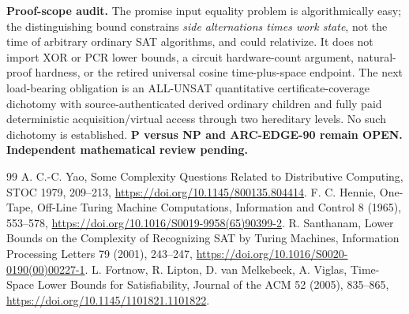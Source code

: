 \documentclass[11pt]{article}
\begin{document}
\textbf{Proof-scope audit.} The promise input equality problem is algorithmically easy; the distinguishing bound constrains \emph{side alternations times work state}, not the time of arbitrary ordinary SAT algorithms, and could relativize. It does not import XOR or PCR lower bounds, a circuit hardware-count argument, natural-proof hardness, or the retired universal cosine time-plus-space endpoint. The next load-bearing obligation is an ALL-UNSAT quantitative certificate-coverage dichotomy with source-authenticated derived ordinary children and fully paid deterministic acquisition/virtual access through two hereditary levels. No such dichotomy is established. \textbf{P versus NP and ARC-EDGE-90 remain OPEN. Independent mathematical review pending.}

\begin{thebibliography}{99}
 A. C.-C. Yao, Some Complexity Questions Related to Distributive Computing, STOC 1979, 209--213, \url{https://doi.org/10.1145/800135.804414}.
 F. C. Hennie, One-Tape, Off-Line Turing Machine Computations, Information and Control 8 (1965), 553--578, \url{https://doi.org/10.1016/S0019-9958(65)90399-2}.
 R. Santhanam, Lower Bounds on the Complexity of Recognizing SAT by Turing Machines, Information Processing Letters 79 (2001), 243--247, \url{https://doi.org/10.1016/S0020-0190(00)00227-1}.
 L. Fortnow, R. Lipton, D. van Melkebeek, A. Viglas, Time-Space Lower Bounds for Satisfiability, Journal of the ACM 52 (2005), 835--865, \url{https://doi.org/10.1145/1101821.1101822}.
\end{thebibliography}
\end{document}
